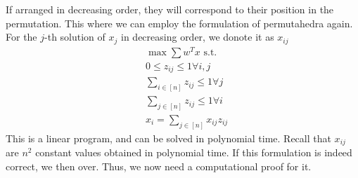 \documentclass[12pt,letterpaper]{article}
\begin{document}
If arranged in decreasing order, they will correspond to their position in the permutation. 
This where we can employ the formulation of permutahedra again. \\
For the $j$-th solution of $x_j$ in decreasing order, we donote it as $x_{ij}$
\begin{align*}
    &\max \sum w^T x \text{ s.t. } \\
    & 0 \leq z_{ij} \leq 1 \forall i, j \\
    &\sum_{i \in [n]} z_{ij} \leq 1 \forall j \\
    &\sum_{j \in [n]} z_{ij} \leq 1 \forall i \\
    &x_i = \sum_{j \in [n]} x_{ij} z_{ij} 
\end{align*} 
This is a linear program, and can be solved in polynomial time. Recall that $x_{ij}$
are $n^2$ constant values obtained in polynomial time. If this formulation is indeed correct, 
we then over. Thus, we now need a computational proof for it. 
\end{document}
